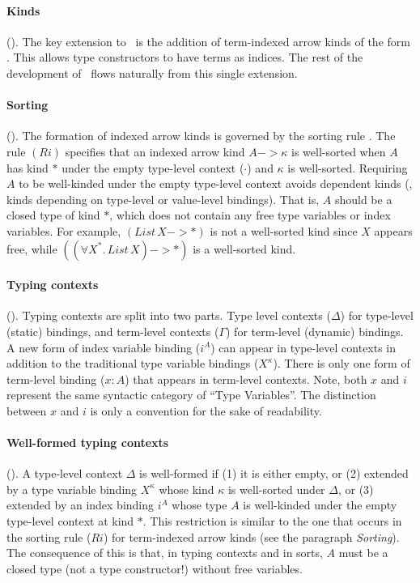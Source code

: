 \paragraph{Kinds\!}().\;
The key extension to \Fw\ is the addition of term-indexed arrow kinds of
the form . This allows type constructors to have terms
as indices. The rest of the development of \Fi\ flows naturally from
this single extension.

\paragraph{Sorting\!}().\; \label{sorting}
The formation of indexed arrow kinds is
governed by the sorting rule . The rule $(Ri)$ specifies that
an indexed arrow kind $A -> \kappa$ is well-sorted when $A$ has kind $*$
under the empty type-level context ($\cdot$) and $\kappa$ is well-sorted.
Requiring $A$ to be well-kinded under the empty type-level context avoids
dependent kinds (\ie, kinds depending on type-level or value-level bindings).
That is, $A$ should be a closed type of kind $*$,
which does not contain any free type variables or index variables.
For example, $(\textit{List}\,X -> *)$ is not a well-sorted kind since $X$
appears free, while $((\forall X^{*}\!.\,\textit{List}\,X) -> *)$ is a well-sorted kind.

\paragraph{Typing contexts\!}().\;
Typing contexts are split into two parts.
Type level contexts ($\Delta$) for type-level (static) bindings,
and term-level contexts ($\Gamma$) for term-level (dynamic) bindings.
A new form of index variable binding ($i^A$) can appear in type-level contexts
in addition to the traditional type variable bindings ($X^\kappa$).
There is only one form of term-level binding ($x:A$) that appears in
term-level contexts. Note, both $x$ and $i$ represent the same
syntactic category of ``Type Variables''. The distinction between
$x$ and $i$ is only a convention for the sake of readability.

\paragraph{Well-formed typing contexts\!}().\;
A type-level context $\Delta$ is well-formed if (1) it is either empty,
or (2) extended by a type variable binding $X^\kappa$ whose kind $\kappa$ is
well-sorted under $\Delta$, or (3) extended by an index binding $i^A$
whose type $A$ is well-kinded under the empty type-level context at kind $*$.
This restriction is similar to the one that occurs in the sorting rule ($Ri$)
for term-indexed arrow kinds (see the paragraph {\textit{Sorting}}).
The consequence of this is that, in typing contexts and in sorts,
$A$ must be a closed type (not a type constructor!) without free variables.

